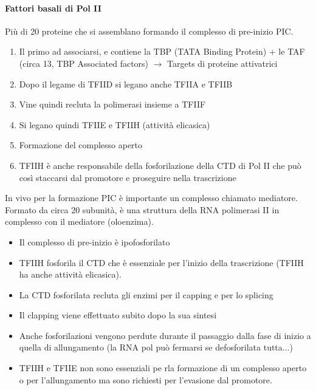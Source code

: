 \documentclass{article}
\begin{document}
\paragraph{Fattori basali di Pol II}
Più di 20 proteine che si assemblano formando il complesso di pre-inizio PIC.
\begin{enumerate}
    \item Il primo ad associarsi, e contiene la TBP (TATA Binding Protein) + le TAF (circa 13, TBP Associated factors) $\rightarrow$ Targets di proteine attivatrici
    \item Dopo il legame di TFIID si legano anche TFIIA e TFIIB
    \item Vine quindi recluta la polimerasi insieme a TFIIF
    \item Si legano quindi TFIIE e TFIIH (attività elicasica)
    \item Formazione del complesso aperto
    \item TFIIH è anche responsabile della fosforilazione della CTD di Pol II che può così staccarsi dal promotore e proseguire nella trascrizione
\end{enumerate}
In vivo per la formazione PIC è importante un complesso chiamato mediatore.\\
Formato da circa 20 subunità, è una struttura della RNA polimerasi II in complesso con il mediatore (oloenzima).
\begin{itemize}
    \item Il complesso di pre-inizio è ipofosforilato
    \item TFIIH fosforila il CTD che è essenziale per l'inizio della trascrizione (TFIIH ha anche attività elicasica).
    \item La CTD fosforilata recluta gli enzimi per il capping e per lo splicing
    \item Il clapping viene effettuato subito dopo la sua sintesi
    \item Anche fosforilazioni vengono perdute durante il passaggio dalla fase di inizio a quella di allungamento (la RNA pol può fermarsi se defosforilata tutta...)
    \item TFIIH e TFIIE non sono essenziali pe rla formazione di un complesso aperto o per l'allungamento ma sono richiesti per l'evasione dal promotore.
\end{itemize}
\end{document}
